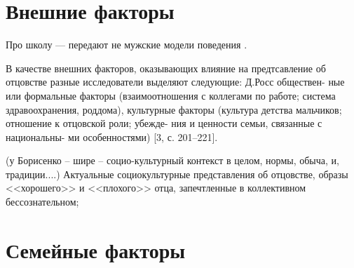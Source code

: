 \documentclass{../../common/thesisbyxetex}
\begin{document}
\section{Внешние факторы}

Про школу --- передают не мужские модели поведения \cite{md}.

В качестве внешних факторов, оказывающих влияние на предтсавление об отцовстве разные исследователи
выделяют следующие:
Д.Росс обществен-
ные или формальные факторы (взаимоотношения
с коллегами по работе; система здравоохранения,
роддома), культурные факторы (культура детства
мальчиков; отношение к отцовской роли; убежде-
ния и ценности семьи, связанные с национальны-
ми особенностями) [3, с. 201–221].\cite[40]{otage}

(у Борисенко – шире – социо-культурный контекст в целом, нормы,
обыча, и, традиции....)\cite{psyot}
Актуальные социокультурные представления об отцовстве, образы <<хорошего>> и <<плохого>>
отца, запечтленные в коллективном бессознательном;
\section{Семейные факторы}
\end{document}
